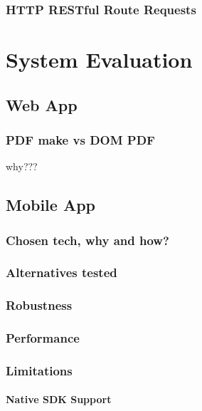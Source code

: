\subsection{HTTP RESTful Route Requests}

\chapter{System Evaluation}	%
\section{Web App}
	\subsection{PDF make vs DOM PDF}
		why???
	
\section{Mobile App}
\subsection{Chosen tech, why and how?}

\subsection{Alternatives tested}

\subsection{Robustness}

\subsection{Performance}

\subsection{Limitations}
\subsubsection{Native SDK Support}
